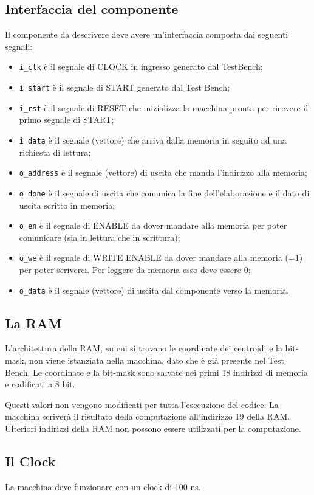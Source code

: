 \documentclass[a4paper,12pt]{article}
\begin{document}
\subsection{Interfaccia del componente}
Il componente da descrivere deve avere un'interfaccia composta dai seguenti segnali:
\begin{itemize}
\item \texttt{i\_clk} è il segnale di CLOCK in ingresso generato dal TestBench;
\item \texttt{i\_start} è il segnale di START generato dal Test Bench;
\item \texttt{i\_rst} è il segnale di RESET che inizializza la macchina pronta per ricevere il primo segnale di START;
\item \texttt{i\_data} è il segnale (vettore) che arriva dalla memoria in seguito ad una richiesta di lettura;
\item \texttt{o\_address} è il segnale (vettore) di uscita che manda l’indirizzo alla memoria;
\item \texttt{o\_done} è il segnale di uscita che comunica la fine dell’elaborazione e il dato di uscita scritto in memoria;
\item \texttt{o\_en} è il segnale di ENABLE da dover mandare alla memoria per poter comunicare (sia in lettura che in scrittura);
\item \texttt{o\_we} è il segnale di WRITE ENABLE da dover mandare alla memoria (=1) per poter scriverci. Per leggere da memoria esso deve essere 0;
\item \texttt{o\_data} è il segnale (vettore) di uscita dal componente verso la memoria.
\end{itemize}
\subsection{La RAM}
L'architettura della RAM, su cui si trovano le coordinate dei centroidi e la bit-mask, non viene istanziata nella macchina, dato che è già presente nel Test Bench. Le coordinate e la bit-mask sono salvate nei primi 18 indirizzi di memoria e codificati a 8 bit. 

Questi valori non vengono modificati per tutta l'esecuzione del codice. La macchina scriverà il risultato della computazione all'indirizzo 19 della RAM. Ulteriori indirizzi della RAM non possono essere utilizzati per la computazione.
\subsection{Il Clock}
La macchina deve funzionare con un clock di 100 ns.
\end{document}
